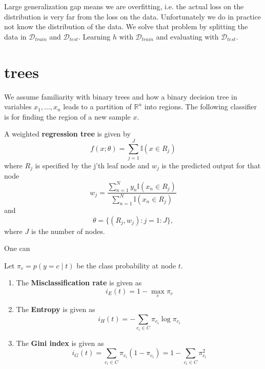 \begin{rmk}
    Large generalization gap means we are overfitting, i.e. the actual loss on the distribution is very far from the loss on the data.
    Unfortunately we do in practice not know the distribution of the data.
    We solve that problem by splitting the data in $ \mathcal{ D }_{train} $ and $ \mathcal{ D }_{test} $. 
    Learning $ h $ with $ \mathcal{ D }_{train} $ and evaluating with $ \mathcal{D}_{test}$.
\end{rmk}

\section{trees}

We assume familiarity with binary trees and how a binary decision tree in variables $ x_1 , \dotsc , x_n $ leads to a partition of $ \mathbb{ R }^n $ into regions.
The following classifier is for finding the region of a new sample $ x $.

\begin{defi}
\cite[ch. 18.1]{pml1Book}
    A weighted \textbf{regression tree} is given by 
    \[
        f ( x ; \theta ) 
        = 
        \sum_{ j = 1 }^J \mathbb{ I } ( x \in R_j )
    \]
    where $ R_j $ is specified by the j'th leaf node and $ w_j $ is the predicted output for that node
    \[
        w_j 
        =
        \frac{ \sum_{ n = 1 }^N y_n \mathbb{ I } ( x_n \in R_j ) }{ \sum_{ n = 1 }^N \mathbb{ I } ( x_n \in R_j )}
    \]
    and 
    \[
        \theta = \{ ( R_j , w_j ) \colon j = 1 : J \},
    \]
    where $ J $ is the number of nodes.
\end{defi}

\begin{rmk}
    One can 
\end{rmk}




\begin{defi}
    Let $ \pi_c = p ( y = c \mid t ) $ be the class probability at node $ t $.
    \begin{enumerate}
        \item 
        The \textbf{Misclassification rate} is given as 
        \[
            i_E ( t ) = 1 - \max_c \pi_c
        \]
        
        \item 
        The \textbf{Entropy} is given as 
        \[
            i_H ( t ) = - \sum_{ c_i \in C } \pi_{ c_i } \log \pi_{ c_i }
        \]

        \item 
        The \textbf{Gini index} is given as
        \[
            i_G ( t )
            =
            \sum_{ c_i \in C } \pi_{ c_i } ( 1 - \pi_{ c_i } ) 
            =
            1 - \sum_{ c_i \in C } \pi_{ c_i }^2
        \]
    \end{enumerate}
\end{defi}


